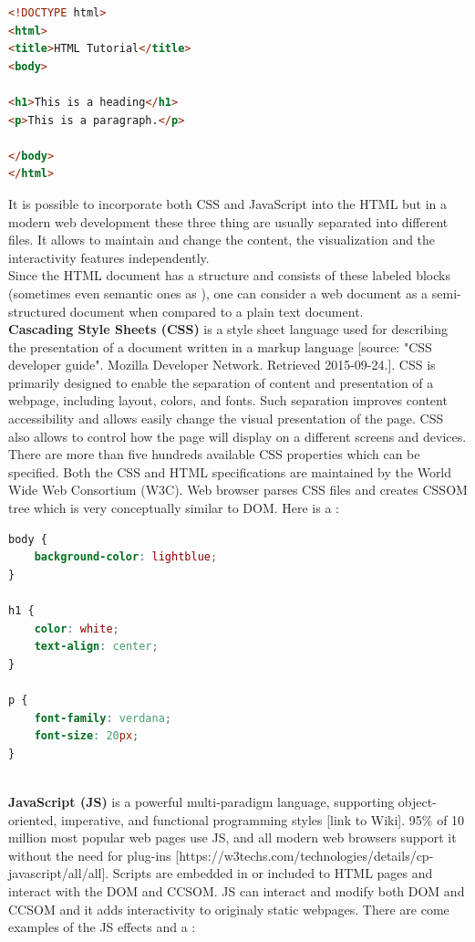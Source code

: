 \begin{lstlisting}[language=html, caption={Small example of HTML file}, label={lst:html}, captionpos=b]
<!DOCTYPE html>
<html>
<title>HTML Tutorial</title>
<body>

<h1>This is a heading</h1>
<p>This is a paragraph.</p>

</body>
</html>
\end{lstlisting}

It is possible to incorporate both CSS and JavaScript into the HTML but in a modern web development these three thing are usually separated into different files. It allows to maintain and change the content, the visualization and the interactivity features independently.\\

Since the HTML document has a structure and consists of these labeled blocks (sometimes even semantic ones as ), one can consider a web document as a semi-structured document when compared to a plain text document.\\

\noindent\textbf{Cascading Style Sheets (CSS)} is a style sheet language used for describing the presentation of a document written in a markup language [source: "CSS developer guide". Mozilla Developer Network. Retrieved 2015-09-24.]. CSS is primarily designed to enable the separation of content and presentation of a webpage, including layout, colors, and fonts. Such separation improves content accessibility and allows easily change the visual presentation of the page. CSS also allows to control how the page will display on a different screens and devices. There are more than five hundreds available CSS properties which can be specified. Both the CSS and HTML specifications are maintained by the World Wide Web Consortium (W3C). Web browser parses CSS files and creates CSSOM tree which is very conceptually similar to DOM. Here is a : \\

\begin{lstlisting}[language=css, caption={Small example of CSS file}, label={lst:css}, captionpos=b]
body {
    background-color: lightblue;
}

h1 {
    color: white;
    text-align: center;
}

p {
    font-family: verdana;
    font-size: 20px;
}
\end{lstlisting}\\

\noindent\textbf{JavaScript (JS)} is a powerful multi-paradigm language, supporting object-oriented, imperative, and functional programming styles [link to Wiki]. 95\% of 10 million most popular web pages use JS, and all modern web browsers support it without the need for plug-ins [https://w3techs.com/technologies/details/cp-javascript/all/all]. Scripts are embedded in or included to HTML pages and interact with the DOM and CCSOM. JS can interact and modify both DOM and CCSOM and it adds interactivity to originaly static webpages. There are come examples of the JS effects and a :

